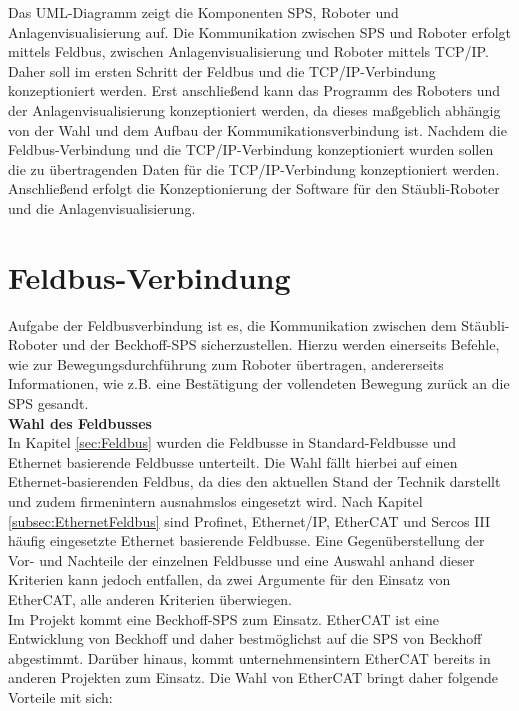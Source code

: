 \documentclass[ a4paper,
                oneside,
                toc=bibliography,
                toc=listof
                ]{scrbook}
\begin{document}
	\noindent
	Das UML-Diagramm zeigt die Komponenten SPS, Roboter und Anlagenvisualisierung auf. Die Kommunikation zwischen SPS und Roboter erfolgt mittels Feldbus, zwischen Anlagenvisualisierung und Roboter mittels TCP/IP. Daher soll im ersten Schritt der Feldbus und die TCP/IP-Verbindung konzeptioniert werden. Erst anschließend kann das Programm des Roboters und der Anlagenvisualisierung konzeptioniert werden, da dieses maßgeblich abhängig von der Wahl und dem Aufbau der Kommunikationsverbindung ist. Nachdem die Feldbus-Verbindung und die TCP/IP-Verbindung konzeptioniert wurden sollen die zu übertragenden Daten für die TCP/IP-Verbindung konzeptioniert werden. Anschließend erfolgt die Konzeptionierung der Software für den Stäubli-Roboter und die Anlagenvisualisierung.
	 
	\section{Feldbus-Verbindung}
	\label{sec:KonzeptFeldbus}
	Aufgabe der Feldbusverbindung ist es, die Kommunikation zwischen dem Stäubli-Roboter und der Beckhoff-SPS sicherzustellen. Hierzu werden einerseits Befehle, wie zur Bewegungsdurchführung zum Roboter übertragen, andererseits Informationen, wie z.B. eine Bestätigung der vollendeten Bewegung zurück an die SPS gesandt.\vspace{0.5\baselineskip}\\
	\textbf{Wahl des Feldbusses}\\
	In Kapitel \ref{sec:Feldbus} wurden die Feldbusse in Standard-Feldbusse und Ethernet basierende Feldbusse unterteilt. Die Wahl fällt hierbei auf einen Ethernet-basierenden Feldbus, da dies den aktuellen Stand der Technik darstellt und zudem firmenintern ausnahmslos eingesetzt wird. Nach Kapitel \ref{subsec:EthernetFeldbus} sind Profinet, Ethernet/IP, EtherCAT und Sercos III häufig eingesetzte Ethernet basierende Feldbusse. Eine Gegenüberstellung der Vor- und Nachteile der einzelnen Feldbusse und eine Auswahl anhand dieser Kriterien kann jedoch entfallen, da zwei Argumente für den Einsatz von EtherCAT, alle anderen Kriterien überwiegen.\\
	Im Projekt kommt eine Beckhoff-SPS zum Einsatz. EtherCAT ist eine Entwicklung von Beckhoff und daher bestmöglichst auf die SPS von Beckhoff abgestimmt. Darüber hinaus, kommt unternehmensintern EtherCAT bereits in anderen Projekten zum Einsatz. Die Wahl von EtherCAT bringt daher folgende Vorteile mit sich:
\end{document}

